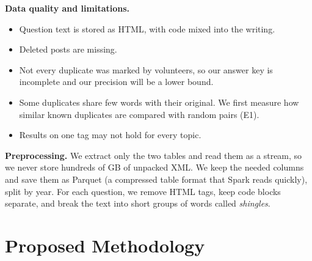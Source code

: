 \documentclass[11pt,a4paper]{article}
\begin{document}
\textbf{Data quality and limitations.}
\begin{itemize}
  \item Question text is stored as HTML, with code mixed into the writing.
  \item Deleted posts are missing.
  \item Not every duplicate was marked by volunteers, so our answer key is
        incomplete and our precision will be a lower bound.
  \item Some duplicates share few words with their original. We first measure
        how similar known duplicates are compared with random pairs (E1).
  \item Results on one tag may not hold for every topic.
\end{itemize}

\textbf{Preprocessing.} We extract only the two tables and read them as a
stream, so we never store hundreds of GB of unpacked XML. We keep the needed
columns and save them as Parquet (a compressed table format that Spark reads
quickly), split by year. For each question, we remove HTML tags, keep code
blocks separate, and break the text into short groups of words called
\emph{shingles}.

\section{Proposed Methodology}
\end{document}
